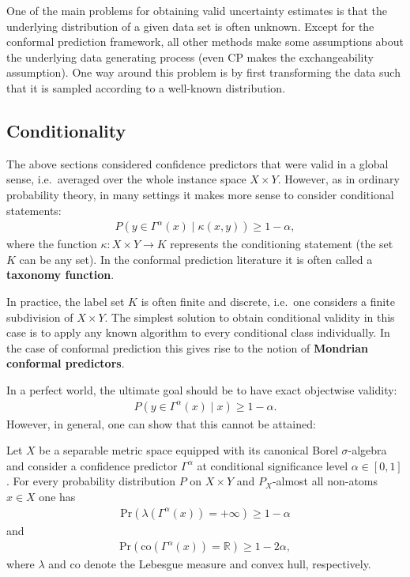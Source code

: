     One of the main problems for obtaining valid uncertainty estimates is that the underlying distribution of a given data set is often unknown. Except for the conformal prediction framework, all other methods make some assumptions about the underlying data generating process (even CP makes the exchangeability assumption). One way around this problem is by first transforming the data such that it is sampled according to a well-known distribution.



\subsection{Conditionality}

    The above sections considered confidence predictors that were valid in a global sense, i.e.~averaged over the whole instance space $X\times Y$. However, as in ordinary probability theory, in many settings it makes more sense to consider conditional statements:
    \begin{gather}
        \label{data:conditional_validity_condition}
        P(y\in\Gamma^\alpha(x)\mid\kappa(x,y))\geq 1-\alpha,
    \end{gather}
    where the function $\kappa:X\times Y\rightarrow K$ represents the conditioning statement (the set $K$ can be any set). In the conformal prediction literature it is often called a \textbf{taxonomy function}.

    In practice, the label set $K$ is often finite and discrete, i.e.~one considers a finite subdivision of $X\times Y$. The simplest solution to obtain conditional validity in this case is to apply any known algorithm to every conditional class individually. In the case of conformal prediction this gives rise to the notion of \textbf{Mondrian conformal predictors}.

    In a perfect world, the ultimate goal should be to have exact objectwise validity:
    \begin{gather}
        P(y\in\Gamma^\alpha(x)\mid x)\geq 1-\alpha.
    \end{gather}
    However, in general, one can show that this cannot be attained:
    \begin{property}[No-go theorem]
        Let $X$ be a separable metric space equipped with its canonical Borel $\sigma$-algebra and consider a confidence predictor $\Gamma^\alpha$ at conditional significance level $\alpha\in[0,1]$. For every probability distribution $P$ on $X\times Y$ and $P_X$-almost all non-atoms $x\in X$ one has
        \begin{gather}
            \mathrm{Pr}(\lambda(\Gamma^\alpha(x))=+\infty)\geq 1-\alpha
        \end{gather}
        and
        \begin{gather}
            \mathrm{Pr}(\mathrm{co}(\Gamma^\alpha(x))=\mathbb{R})\geq 1-2\alpha,
        \end{gather}
        where $\lambda$ and $\mathrm{co}$ denote the Lebesgue measure and convex hull, respectively.
    \end{property}

